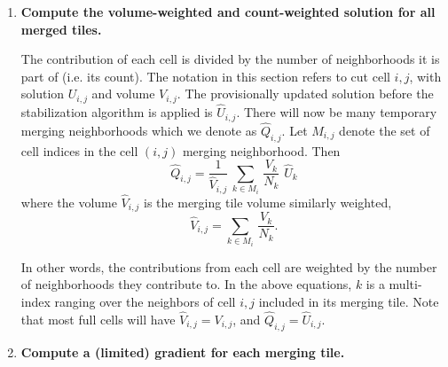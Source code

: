 \begin{enumerate}
\item
{\bf Compute the volume-weighted and count-weighted solution for all
merged tiles.}   

\vspace*{.1in}
The contribution of each cell is divided by the number of neighborhoods 
it is part of (i.e. its count). The notation in this section refers
to cut cell $i,j$, with solution $U_{i,j}$ and volume
$V_{i,j}$. 
The provisionally updated solution before the
stabilization algorithm is applied is $\widehat{U}_{i,j}$.
There will now be many temporary merging neighborhoods which 
we denote as $\widehat{Q}_{i,j}$. 
Let $M_{i,j}$ denote the set of cell indices in the cell $(i,j)$ merging
neighborhood.  Then
\begin{equation}
\label{tiledef}
\widehat{Q}_{i,j} =  \frac{1}{{\widehat V}_{i,j}} \, \sum_{k \in M_i} \,  
\frac{V_k}{N_k}  \,\,  \widehat{U}_k
\end{equation}
where the volume ${\widehat V}_{i,j}$ is the merging tile volume similarly weighted,
\begin{equation}
\label{voldef}
{\widehat V}_{i,j} =  \sum_{k \in M_i } \,  \frac{V_k}{N_k}  .
\end{equation}

In other words, the contributions from each cell are weighted by the
number of neighborhoods they contribute to.
In the above equations, $k$ is  a multi-index ranging over the neighbors 
of cell $i,j$ included in its merging tile.
Note that most full cells will have ${\widehat V}_{i,j} = V_{i,j}$, 
and $\widehat{Q}_{i,j}  = \widehat{U}_{i,j}$.





\item
{\bf Compute a (limited) gradient for each merging
tile.}


\end{enumerate}

